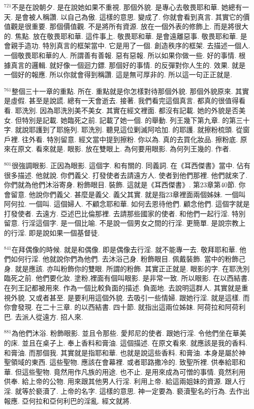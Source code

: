 \documentclass{book}
\begin{document}
$^{721}$不是在說朝夕.
是在說她如果不重視.
那個外貌.
是專心去敬畏耶和華.
她總有一天.
是會被人稱讚.
以自己為傲.
這樣的意思.
變成了.
你就會看到真言.
其實它的價值觀是很重要.
那個價值觀.
不是將所有資源.
放在一個外表的修飾上.
而是將很大的.
焦點.
放在敬畏耶和華.
這件事上.
敬畏耶和華.
是會遠離惡事.
敬畏耶和華.
是會親手造功.
特別真言的框架當中.
它是用了一個.
創造秩序的框架.
去描述一個人.
一個敬畏耶和華的人.
所謂善有善報.
惡有惡報.
所以如果你做一些.
好的事情.
根據真言的邏輯.
就好像一個迴力鏢.
那個好的事情.
的反彈對你人生的.
效果.
就是一個好的報應.
所以你就會得到稱讚.
這是無可厚非的.
所以這一句正正就是.

$^{761}$整個三十一章的重點.
所在.
重點就是你怎樣對待那個外貌.
那個外貌原來.
其實是虛假.
甚至是說謊.
總有一天會逝去.
接著.
我們看完這個真言.
都真的很值得看看.
耶洗別.
因為耶洗別美不美女.
其實在經文裡面.
都沒有記載.
她的外貌是否美女.
但特別是記載.
她臨死之前.
記載了她一個.
的舉動.
列王幾下第九章.
的第三十字.
就說耶護到了耶施列.
耶洗別.
聽見這位剿滅阿哈加.
的耶護.
就擦粉梳頭.
從窗戶裡.
往外看.
特別留意.
經文當中提到擦粉.
你以為.
真的去買化妝品.
擦粉底.
原來在原文.
看來就是.
眼影.
放在雙眼上.
為何要用眼影.
為何列王幾的.
作者.

$^{801}$很強調眼影.
正因為眼影.
這個字.
和有關的.
同義詞.
在《耳西傑書》當中.
佔有很多描述.
他就說.
你們義父.
打發使者去請遠方人.
使者到他們那裡.
他們就來了.
你們就為他們沐浴寄身.
粉飾眼目.
裝飾.
這就是《耳西傑書》.
第23章第40節.
你會留意.
他說你們義父.
甚麼是義父.
義父其實.
就是指23章裡面兩個姊妹.
一個叫阿何拉.
一個叫.
這個婦人.
不顧念耶和華.
如何去恩待他們.
顧念他們.
這個字就是打發使者.
去遠方.
亞述巴比倫那裡.
去請那些國家的使者.
和他們一起行淫.
特別留意.
行淫這個字.
是一個比喻.
不是說一個男女之間的行淫.
更簡單.
是說宗教上的行淫.
即是說如果一個基督徒.

$^{841}$在拜偶像的時候.
就是和偶像.
即是偶像去行淫.
就不能專一去.
敬拜耶和華.
他們如何行淫.
他就說你們為他們.
去沐浴己身.
粉飾眼目.
佩戴裝飾.
當中的粉飾己身.
就是應該.
亦叫粉飾你的雙眼.
所謂的粉飾.
其實正正就是.
眼影的字.
在耶洗別臨死之前.
他們要化妝.
塗粉,裡面有個叫眼影.
是非常一致.
所以眼影.
在以西結書.
在列王記都被用來.
作為一個比較負面的描述.
負面地.
去說明這群人.
其實就是重視外貌.
又或者甚至.
是要利用這個外貌.
去吸引一些情婦.
跟她行淫.
就是這樣.
而你會發現.
在二十三章.
的以西結書.
四十節.
就指出這兩位姊妹.
阿荷拉和阿荷利巴.
去派人從遠方.
招人來.

$^{881}$為他們沐浴.
粉飾眼影.
並且令那些.
愛邦尼的使者.
跟她行淫.
令他們坐在華美的床.
並且在桌子上.
奉上香料和膏油.
這個描述.
在原文看來.
就應該是我的香料.
和膏油.
而那個我.
其實就是指耶和華.
也就是說這些香料.
和膏油.
本身是屬於神聖領域的東西.
這些聖物.
應該在會幕裡.
或者耶路撒冷的.
致聖所裡.
供奉給耶和華.
但這些聖物.
竟然用作凡族的用途.
也不止.
是用來成為可憎的事情.
竟然利用供奉.
給上帝的公物.
用來跟其他男人行淫.
利用上帝.
給這兩姐妹的資源.
跟人行淫.
就等於褻瀆了.
上帝的名字.
這樣的意思.
神一定要為.
褻瀆聖名的行為.
去作出報應.
亞何拉和亞何利巴的淫亂.
經文就將.
\end{document}
